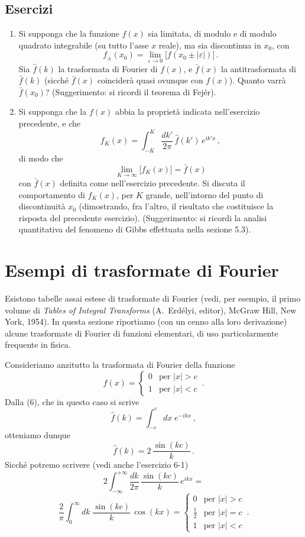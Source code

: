 \documentclass[11pt, a4paper]{book}
\numberwithin{equation}{section}
\newenvironment{esercizi}{\subsection*{Esercizi}\begin{enumerate}}{\end{enumerate}}
\begin{document}
\begin{esercizi}
\item Si supponga che la funzione $f(x)$ sia limitata, di modulo e di modulo quadrato integrabile (su tutto l'asse $x$ reale), ma sia discontinua in $x_0$, con
\[
  f_\pm(x_0) = \lim_{\varepsilon\to 0}\bigl[f(x_0\pm|\varepsilon|)\bigr]\,.
\]
Sia $\hat{f}(k)$ la trasformata di Fourier di $f(x)$, e $\bar{f}(x)$ la antitrasformata di $\hat{f}(k)$ (sicché $\bar{f}(x)$ coinciderà quasi ovunque con $f(x)$). Quanto varrà $\bar{f}(x_0)$? (Suggerimento: si ricordi il teorema di Fejér).

\item Si supponga che la $f(x)$ abbia la proprietà indicata nell'esercizio precedente, e che
\[
  f_K(x) = \int_{-K}^{K}\frac{dk'}{2\pi}\,\hat{f}(k')\,e^{ik'x}\,,
\]
di modo che
\[
  \lim_{K\to\infty}\bigl[f_K(x)\bigr] = \bar{f}(x)
\]
con $\bar{f}(x)$ definita come nell'esercizio precedente. Si discuta il comportamento di $f_K(x)$, per $K$ grande, nell'intorno del punto di discontinuità $x_0$ (dimostrando, fra l'altro, il risultato che costituisce la risposta del precedente esercizio). (Suggerimento: si ricordi la analisi quantitativa del fenomeno di Gibbs effettuata nella sezione 5.3).
\end{esercizi}

\section{Esempi di trasformate di Fourier}

Esistono tabelle assai estese di trasformate di Fourier (vedi, per esempio, il primo volume di \textit{Tables of Integral Transforms} (A.\ Erdélyi, editor), McGraw Hill, New York, 1954). In questa sezione riportiamo (con un cenno alla loro derivazione) alcune trasformate di Fourier di funzioni elementari, di uso particolarmente frequente in fisica.

Consideriamo anzitutto la trasformata di Fourier della funzione
\begin{equation}
  f(x) = \begin{cases} 0 & \text{per } |x|>c \\ 1 & \text{per } |x|<c \end{cases}\,. \tag{1}
\end{equation}
Dalla (6), che in questo caso si scrive
\begin{equation}
  \hat{f}(k) = \int_{-c}^{c} dx\;e^{-ikx}\,, \tag{2}
\end{equation}
otteniamo dunque
\begin{equation}
  \hat{f}(k) = 2\,\frac{\sin(kc)}{k}\,. \tag{3}
\end{equation}
Sicché potremo scrivere (vedi anche l'esercizio 6-1)
\[
  2\int_{-\infty}^{+\infty}\frac{dk}{2\pi}\,\frac{\sin(kc)}{k}\,e^{ikx} =
\]
\begin{equation}
  \frac{2}{\pi}\int_0^\infty dk\;\frac{\sin(kc)}{k}\,\cos(kx)
  = \begin{cases} 0 & \text{per } |x|>c \\ \frac{1}{2} & \text{per } |x|=c \\ 1 & \text{per } |x|<c \end{cases}\,. \tag{4}
\end{equation}
\end{document}
